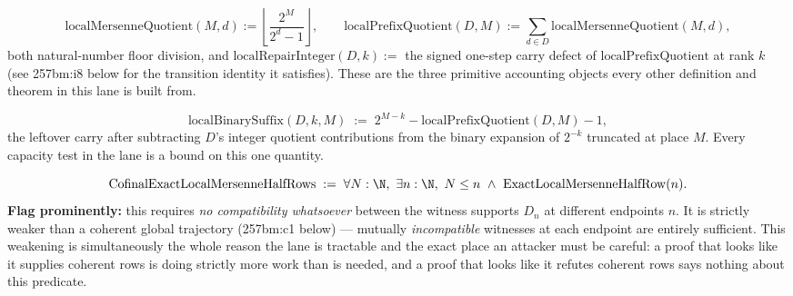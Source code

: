 \begin{defn}
\[
\mathrm{localMersenneQuotient}(M,d) := \left\lfloor \frac{2^M}{2^d-1} \right\rfloor,\qquad
\mathrm{localPrefixQuotient}(D,M) := \sum_{d\in D} \mathrm{localMersenneQuotient}(M,d),
\]
both natural-number floor division, and $\mathrm{localRepairInteger}(D,k) := $ the signed
one-step carry defect of $\mathrm{localPrefixQuotient}$ at rank $k$ (see 257bm:i8 below for the
transition identity it satisfies). These are the three primitive accounting objects every
other definition and theorem in this lane is built from.
\par\noindent{}     
\end{defn}

\begin{defn}
\[
\mathrm{localBinarySuffix}(D,k,M) \;:=\; 2^{M-k} - \mathrm{localPrefixQuotient}(D,M) - 1,
\]
the leftover carry after subtracting $D$'s integer quotient contributions from the binary
expansion of $2^{-k}$ truncated at place $M$. Every capacity test in the lane is a bound on
this one quantity.
\par\noindent{}   
\end{defn}

\begin{defn}
\[
\mathrm{CofinalExactLocalMersenneHalfRows} \;:=\; \forall N:\N,\ \exists n:\N,\ N\le n\ \wedge\ \mathrm{ExactLocalMersenneHalfRow}(n).
\]
\textbf{Flag prominently:} this requires \emph{no compatibility whatsoever} between the
witness supports $D_n$ at different endpoints $n$. It is strictly weaker than a coherent
global trajectory (257bm:c1 below) — mutually \emph{incompatible} witnesses at each endpoint
are entirely sufficient. This weakening is simultaneously the whole reason the lane is
tractable and the exact place an attacker must be careful: a proof that looks like it
supplies coherent rows is doing strictly more work than is needed, and a proof that
looks like it refutes coherent rows says nothing about this predicate.
\par\noindent{}   
\end{defn}

